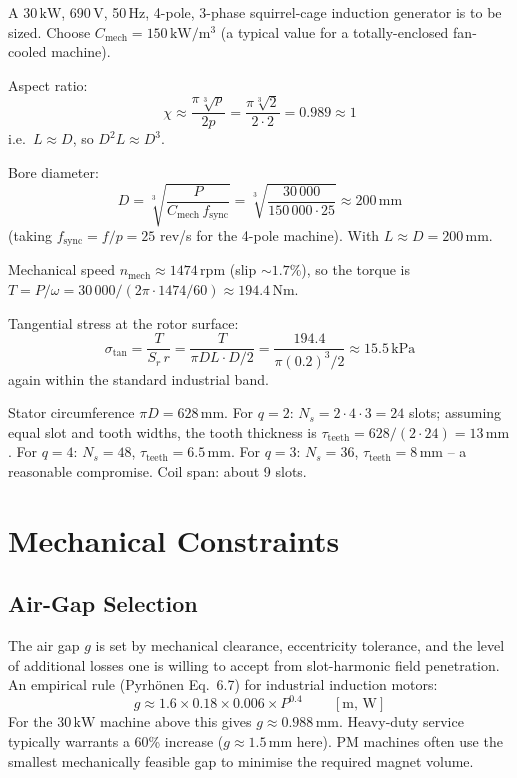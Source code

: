 \documentclass[12pt,a4paper]{article}
\newcommand{\unit}[1]{\ensuremath{\,\mathrm{#1}}}
\begin{document}
A 30\unit{kW}, 690\unit{V}, 50\unit{Hz}, 4-pole, 3-phase squirrel-cage
induction generator is to be sized.
Choose $C_\text{mech} = 150\unit{kW/m^3}$ (a typical value for a
totally-enclosed fan-cooled machine).

Aspect ratio:
\begin{equation}
  \chi \approx \frac{\pi\sqrt[3]{p}}{2p}
        = \frac{\pi\sqrt[3]{2}}{2\cdot 2}
        = 0.989 \approx 1
\end{equation}
i.e.\ $L \approx D$, so $D^2 L \approx D^3$.

Bore diameter:
\begin{equation}
  D = \sqrt[3]{\frac{P}{C_\text{mech}\,f_\text{sync}}}
    = \sqrt[3]{\frac{30\,000}{150\,000\cdot 25}}
    \approx 200\unit{mm}
\end{equation}
(taking $f_\text{sync} = f/p = 25$ rev/s for the 4-pole machine).
With $L \approx D = 200\unit{mm}$.

Mechanical speed $n_\text{mech} \approx 1474\unit{rpm}$
(slip $\sim 1.7\%$), so the torque is
$T = P/\omega = 30\,000/(2\pi\cdot 1474/60) \approx 194.4\unit{Nm}$.

Tangential stress at the rotor surface:
\begin{equation}
  \sigma_\text{tan}
    = \frac{T}{S_r\,r}
    = \frac{T}{\pi D L \cdot D/2}
    = \frac{194.4}{\pi(0.2)^3/2}
    \approx 15.5\unit{kPa}
\end{equation}
again within the standard industrial band.

Stator circumference $\pi D = 628\unit{mm}$.
For $q=2$: $N_s = 2\cdot 4\cdot 3 = 24$ slots; assuming equal slot and
tooth widths, the tooth thickness is
$\tau_\text{teeth} = 628/(2\cdot 24) = 13\unit{mm}$.
For $q=4$: $N_s=48$, $\tau_\text{teeth} = 6.5\unit{mm}$.
For $q=3$: $N_s=36$, $\tau_\text{teeth} = 8\unit{mm}$ -- a reasonable
compromise.
Coil span: about 9 slots.

\section{Mechanical Constraints}
\label{sec:mech}

\subsection{Air-Gap Selection}

The air gap $g$ is set by mechanical clearance, eccentricity tolerance,
and the level of additional losses one is willing to accept from
slot-harmonic field penetration. An empirical rule
(Pyrh\"onen Eq.~6.7) for industrial induction motors:
\begin{equation}
  g \approx 1.6 \times 0.18 \times 0.006 \times P^{0.4}
  \qquad\unit{[m,\,W]}
\end{equation}
For the 30\unit{kW} machine above this gives $g \approx 0.988\unit{mm}$.
Heavy-duty service typically warrants a 60\% increase
($g \approx 1.5\unit{mm}$ here). PM machines often use the smallest
mechanically feasible gap to minimise the required magnet volume.
\end{document}
